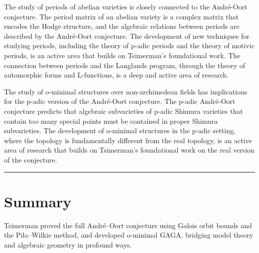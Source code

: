 The study of periods of abelian varieties is closely connected to the Andr\'{e}-Oort conjecture. The period matrix of an abelian variety is a complex matrix that encodes the Hodge structure, and the algebraic relations between periods are described by the Andr\'{e}-Oort conjecture. The development of new techniques for studying periods, including the theory of p-adic periods and the theory of motivic periods, is an active area that builds on Tsimerman's foundational work. The connection between periods and the Langlands program, through the theory of automorphic forms and L-functions, is a deep and active area of research.

The study of o-minimal structures over non-archimedean fields has implications for the p-adic version of the Andr\'{e}-Oort conjecture. The p-adic Andr\'{e}-Oort conjecture predicts that algebraic subvarieties of p-adic Shimura varieties that contain too many special points must be contained in proper Shimura subvarieties. The development of o-minimal structures in the p-adic setting, where the topology is fundamentally different from the real topology, is an active area of research that builds on Tsimerman's foundational work on the real version of the conjecture.

\begin{center}\rule{0.5\linewidth}{0.5pt}\end{center}

\section*{Summary}

Tsimerman proved the full Andr\'{e}--Oort conjecture using Galois orbit bounds and the Pila--Wilkie method, and developed o-minimal GAGA, bridging model theory and algebraic geometry in profound ways.

